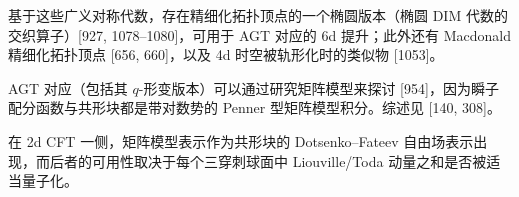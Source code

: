 基于这些广义对称代数，存在精细化拓扑顶点的一个椭圆版本（椭圆 DIM 代数的交织算子）[927, 1078--1080]，可用于 AGT 对应的 6d 提升；此外还有 Macdonald 精细化拓扑顶点 [656, 660]，以及 4d 时空被轨形化时的类似物 [1053]。

AGT 对应（包括其 $q$-形变版本）可以通过研究矩阵模型来探讨 [954]，因为瞬子配分函数与共形块都是带对数势的 Penner 型矩阵模型积分。综述见 [140, 308]。

在 2d CFT 一侧，矩阵模型表示作为共形块的 Dotsenko--Fateev 自由场表示出现，而后者的可用性取决于每个三穿刺球面中 Liouville/Toda 动量之和是否被适当量子化。

